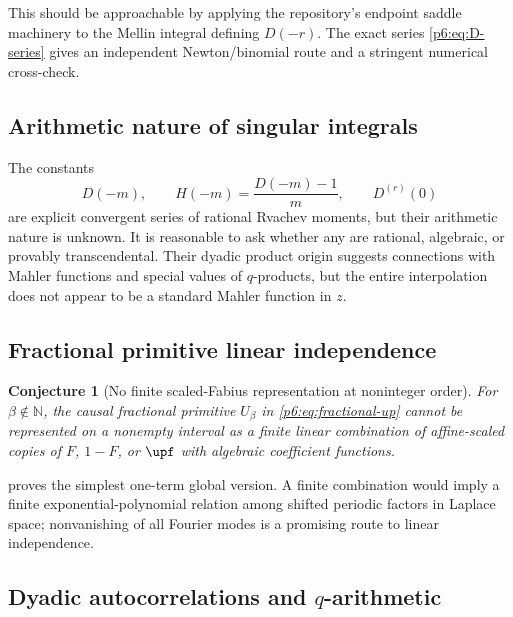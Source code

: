 \documentclass[11pt,oneside]{article}
\newtheorem{conjecture}[theorem]{Conjecture}
\theoremstyle{definition}
\theoremstyle{remark}
\newcommand{\N}{\mathbb N}
\newcommand{\1}{\mathbf 1}
\begin{document}
This should be approachable by applying the repository's endpoint saddle machinery to
the Mellin integral defining \(D(-r)\).  The exact series \eqref{p6:eq:D-series} gives an
independent Newton/binomial route and a stringent numerical cross-check.

\subsection{Arithmetic nature of singular integrals}

The constants
\begin{equation}
 D(-m),\qquad H(-m)=\frac{D(-m)-1}{m},\qquad
 D^{(r)}(0)                                                \label{p6:eq:arithmetic-constants}
\end{equation}
are explicit convergent series of rational Rvachev moments, but their arithmetic nature
is unknown.  It is reasonable to ask whether any are rational, algebraic, or provably
transcendental.  Their dyadic product origin suggests connections with Mahler functions
and special values of \(q\)-products, but the entire interpolation does not appear to be
a standard Mahler function in \(z\).

\subsection{Fractional primitive linear independence}

\begin{conjecture}[No finite scaled-Fabius representation at noninteger order]
For \(\beta\notin\N\), the causal fractional primitive \(U_\beta\) in
\eqref{p6:eq:fractional-up} cannot be represented on a nonempty interval as a finite linear
combination of affine-scaled copies of \(F\), \(1-F\), or \(\upf\) with algebraic
coefficient functions.
\end{conjecture}

 proves the simplest one-term global version.  A finite
combination would imply a finite exponential-polynomial relation among shifted periodic
factors in Laplace space; nonvanishing of all Fourier modes is a promising route to
linear independence.

\subsection{Dyadic autocorrelations and \(q\)-arithmetic}
\end{document}
